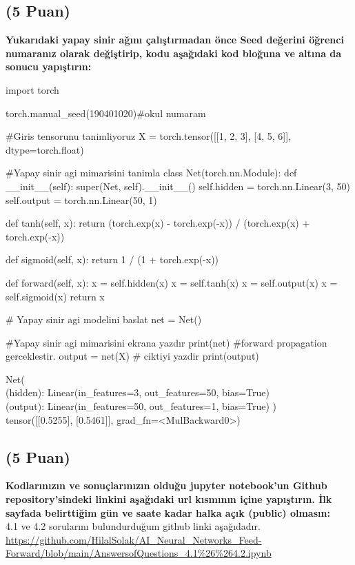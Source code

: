 \documentclass[11pt]{article}
\begin{document}
\subsection{(5 Puan)} \textbf{Yukarıdaki yapay sinir ağını çalıştırmadan önce Seed değerini öğrenci numaranız olarak değiştirip, kodu aşağıdaki kod bloğuna ve altına da sonucu yapıştırın:}

\begin{python}
import torch

torch.manual_seed(190401020)#okul numaram

#Giris tensorunu tanimliyoruz
X = torch.tensor([[1, 2, 3], [4, 5, 6]], dtype=torch.float)

#Yapay sinir agi mimarisini tanimla
class Net(torch.nn.Module):
    def __init__(self):
        super(Net, self).__init__()
        self.hidden = torch.nn.Linear(3, 50)
        self.output = torch.nn.Linear(50, 1)
        
    def tanh(self, x):
        return (torch.exp(x) - torch.exp(-x)) / (torch.exp(x) + torch.exp(-x))
    
    def sigmoid(self, x):
        return 1 / (1 + torch.exp(-x))
        
    def forward(self, x):
        x = self.hidden(x)
        x = self.tanh(x)
        x = self.output(x)
        x = self.sigmoid(x)
        return x

# Yapay sinir agi modelini baslat  
net = Net()

#Yapay sinir agi mimarisini ekrana yazdır
print(net)
#forward propagation gerceklestir.
output = net(X)
# ciktiyi yazdir
print(output)
\end{python}

Net(\\
  (hidden): Linear(in_features=3, out_features=50, bias=True)\\
  (output): Linear(in_features=50, out_features=1, bias=True)
)    \\
tensor([[0.5255],
        [0.5461]], grad_fn=<MulBackward0>)

\subsection{(5 Puan)} \textbf{Kodlarınızın ve sonuçlarınızın olduğu jupyter notebook'un Github repository'sindeki linkini aşağıdaki url kısmının içine yapıştırın. İlk sayfada belirttiğim gün ve saate kadar halka açık (public) olmasın:}\\
4.1 ve 4.2 sorularını bulundurduğum github linki aşağıdadır.\\
\url{https://github.com/HilalSolak/AI_Neural_Networks_Feed-Forward/blob/main/AnswersofQuestions_4.1%26%264.2.ipynb}
\end{document}
